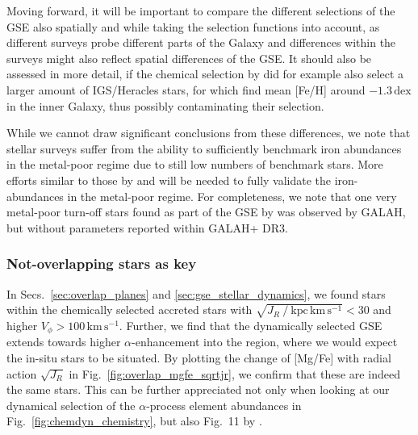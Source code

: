 \documentclass[fleqn,usenatbib]{mnras}
\newcommand{\dex}{\,\mathrm{dex}}	%
\begin{document}
Moving forward, it will be important to compare the different selections of the GSE also spatially and while taking the selection functions into account, as different surveys probe different parts of the Galaxy and differences within the surveys might also reflect spatial differences of the GSE. It should also be assessed in more detail, if the chemical selection by \citet{Das2020} did for example also select a larger amount of IGS/Heracles stars, for which \citet{Horta2021} find mean [Fe/H] around $-1.3\dex$ in the inner Galaxy, thus possibly contaminating their selection.

While we cannot draw significant conclusions from these differences, we note that stellar surveys suffer from the ability to sufficiently benchmark iron abundances in the metal-poor regime due to still low numbers of benchmark stars. More efforts similar to those by \citet{Hawkins2016} and \citet{Karovicova2020} will be needed to fully validate the iron-abundances in the metal-poor regime. For completeness, we note that one very metal-poor turn-off stars found as part of the GSE by \citet{Naidu2020} was observed by GALAH, but without parameters reported within GALAH+ DR3.

\subsubsection{Not-overlapping stars as key} \label{sec:non_overlap}

In Secs.~\ref{sec:overlap_planes} and \ref{sec:gse_stellar_dynamics}, we found stars within the chemically selected accreted stars with $\sqrt{J_R~/~\mathrm{kpc\,km\,s^{-1}}} < 30$ and higher $V_\phi > 100\,\mathrm{km\,s^{-1}}$. Further, we find that the dynamically selected GSE extends towards higher $\alpha$-enhancement into the region, where we would expect the in-situ stars to be situated. By plotting the change of [Mg/Fe] with radial action $\sqrt{J_R}$ in Fig.~\ref{fig:overlap_mgfe_sqrtjr}, we confirm that these are indeed the same stars. This can be further appreciated not only when looking at our dynamical selection of the $\alpha$-process element abundances in Fig.~\ref{fig:chemdyn_chemistry}, but also Fig.~11 by \citet{Naidu2020}.
\end{document}
